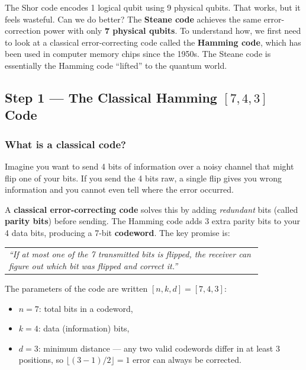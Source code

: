 \documentclass[11pt, a4paper]{article}
\theoremstyle{definition}
\theoremstyle{plain}
\theoremstyle{remark}
\begin{document}
\begin{intuition}
The Shor code encodes 1 logical qubit using 9 physical qubits.  That
works, but it feels wasteful.  Can we do better?  The \textbf{Steane
code} achieves the same error-correction power with only \textbf{7
physical qubits}.  To understand how, we first need to look at a
classical error-correcting code called the \textbf{Hamming code},
which has been used in computer memory chips since the 1950s.  The
Steane code is essentially the Hamming code ``lifted'' to the quantum
world.
\end{intuition}

\subsection{Step 1 --- The Classical Hamming $[7,4,3]$ Code}

\subsubsection{What is a classical code?}

Imagine you want to send 4 bits of information over a noisy channel
that might flip one of your bits.  If you send the 4 bits raw, a
single flip gives you wrong information and you cannot even tell
where the error occurred.

A \textbf{classical error-correcting code} solves this by adding
\emph{redundant} bits (called \textbf{parity bits}) before sending.
The Hamming code adds 3 extra parity bits to your 4 data bits,
producing a 7-bit \textbf{codeword}.  The key promise is:

\begin{center}
\begin{tabular}{@{}p{0.85\linewidth}@{}}
\textit{``If at most one of the 7 transmitted bits is flipped, the
receiver can figure out \emph{which} bit was flipped and correct it.''}
\end{tabular}
\end{center}

The parameters of the code are written $[n,k,d] = [7,4,3]$:
\begin{itemize}
  \item $n = 7$: total bits in a codeword,
  \item $k = 4$: data (information) bits,
  \item $d = 3$: minimum distance --- any two valid codewords differ in
        at least 3 positions, so $\lfloor(3-1)/2\rfloor = 1$ error can
        always be corrected.
\end{itemize}
\end{document}
